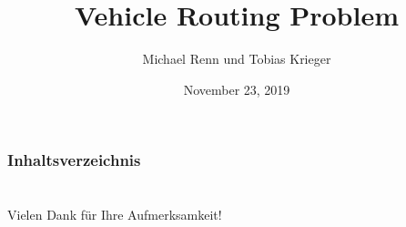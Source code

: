 \documentclass{beamer}
\title[VRP]{Vehicle Routing Problem} %
\author{Michael Renn und Tobias Krieger} %
\institute[H-BRS] %
{
Hochschule Bonn-Rhein-Sieg \\ %
\medskip
\textit{Michael.Renn@smail.inf.h-brs.de}
\textit{Tobias.Krieger@smail.inf.h-brs.de} %
}
\date{November 23, 2019} %
\begin{document}
\begin{frame}
\titlepage %
\end{frame}

\begin{frame}
\frametitle{Inhaltsverzeichnis} %
\tableofcontents %
\end{frame}








\section*{}
\begin{frame}
    \centering 
   \huge Vielen Dank für Ihre Aufmerksamkeit!
\end{frame}
\end{document}
